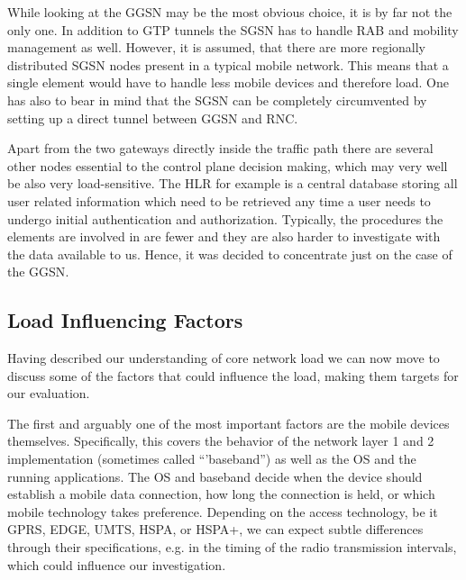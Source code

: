 While looking at the \ac{GGSN} may be the most obvious choice, it is by far not the only one. 
In addition to GTP tunnels the \ac{SGSN} has to handle \ac{RAB} and mobility management as well. However, it is assumed, that there are more regionally distributed \ac{SGSN} nodes present in a typical mobile network. This means that a single element would have to handle less mobile devices and therefore load. One has also to bear in mind that the \ac{SGSN} can be completely circumvented by setting up a direct tunnel between \ac{GGSN} and \ac{RNC}.

Apart from the two gateways directly inside the traffic path there are several other nodes essential to the control plane decision making, which may very well be also very load-sensitive. The \ac{HLR} for example is a central database storing all user related information which need to be retrieved any time a user needs to undergo initial authentication and authorization. Typically, the procedures the elements are involved in are fewer and they are also harder to investigate with the data available to us. Hence, it was decided to concentrate just on the case of the \ac{GGSN}.


\subsection{Load Influencing Factors}

Having described our understanding of core network load we can now move to discuss some of the factors that could influence the load, making them targets for our evaluation.

The first and arguably one of the most important factors are the mobile devices themselves. Specifically, this covers the behavior of the network layer 1 and 2 implementation (sometimes called ``'baseband'') as well as the \ac{OS} and the running applications. The OS and baseband decide when the device should establish a mobile data connection, how long the connection is held, or which mobile technology takes preference. Depending on the access technology, be it \acs{GPRS}, \acs{EDGE}, \acs{UMTS}, \acs{HSPA}, or \acs{HSPA+}, we can expect subtle differences through their specifications, e.g. in the timing of the radio transmission intervals, which could influence our investigation. 

